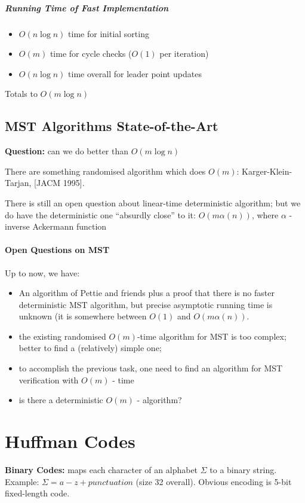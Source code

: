\documentclass{scrartcl}
\begin{document}
\subparagraph{Running Time of Fast Implementation}
\begin{itemize}
\item $O(n \log n)$ time for initial sorting
\item $O(m)$ time for cycle checks ($O(1)$ per iteration)
\item $O(n \log n)$ time overall for leader point updates
\end{itemize}
Totals to $O(m \log n)$

\subsection{MST Algorithms State-of-the-Art}
\label{sec:6-5} {\bf Question: } can we do better than $O(m \log n)$

There are something randomised algorithm which does $O(m)$: Karger-Klein-Tarjan,
[JACM 1995].

There is still an open question about linear-time deterministic algorithm; but
we do have the deterministic one ``absurdly close'' to it: $O(m \alpha (n))$,
where $\alpha$ - inverse Ackermann function
\paragraph{Open Questions on MST}
Up to now, we have:
\begin{itemize}
\item An algorithm of Pettie and friends plus a proof that there is no faster
  deterministic MST algorithm, but precise asymptotic running time is unknown
  (it is somewhere between $O(1)$ and $O(m \alpha (n))$.
\item the existing randomised $O(m)$-time algorithm for MST is too complex;
  better to find a (relatively) simple one;
\item to accomplish the previous task, one need to find an algorithm for MST
  verification with $O(m)$ - time
\item is there a deterministic $O(m)$ - algorithm?
\end{itemize}
\section{Huffman Codes}
\label{sec:7-1} {\bf Binary Codes: } maps each character of an alphabet $\Sigma$
to a binary
string. \\
Example: $\Sigma = a - z + punctuation$ (size 32 overall). Obvious encoding is
5-bit fixed-length code.\\
\end{document}
